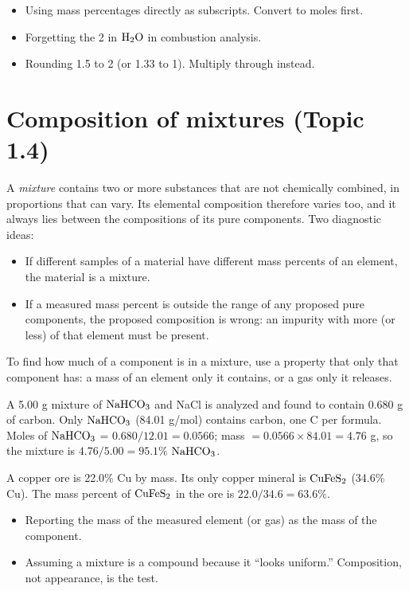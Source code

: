 \documentclass[11pt]{article}
\begin{document}
\errorsh
\begin{itemize}
\item Using mass percentages directly as subscripts. Convert to moles first.
\item Forgetting the 2 in $\ce{H2O}$ in combustion analysis.
\item Rounding 1.5 to 2 (or 1.33 to 1). Multiply through instead.
\end{itemize}

\section{Composition of mixtures (Topic 1.4)}\label{t:1.4}
A \emph{mixture} contains two or more substances that are not chemically combined, in proportions that can vary. Its elemental composition therefore varies too, and it always lies between the compositions of its pure components. Two diagnostic ideas:
\begin{itemize}
\item If different samples of a material have different mass percents of an element, the material is a mixture.
\item If a measured mass percent is outside the range of any proposed pure components, the proposed composition is wrong: an impurity with more (or less) of that element must be present.
\end{itemize}
To find how much of a component is in a mixture, use a property that only that component has: a mass of an element only it contains, or a gas only it releases.

 A 5.00 g mixture of $\ce{NaHCO3}$ and NaCl is analyzed and found to contain 0.680 g of carbon. Only $\ce{NaHCO3}$ (84.01 g/mol) contains carbon, one C per formula. Moles of $\ce{NaHCO3}$ = $0.680/12.01 = 0.0566$; mass $= 0.0566 \times 84.01 = 4.76$ g, so the mixture is $4.76/5.00 = 95.1\%$ $\ce{NaHCO3}$.

 A copper ore is 22.0\% Cu by mass. Its only copper mineral is $\ce{CuFeS2}$ (34.6\% Cu). The mass percent of $\ce{CuFeS2}$ in the ore is $22.0/34.6 = 63.6\%$.

\errorsh
\begin{itemize}
\item Reporting the mass of the measured element (or gas) as the mass of the component.
\item Assuming a mixture is a compound because it ``looks uniform.'' Composition, not appearance, is the test.
\end{itemize}
\end{document}
